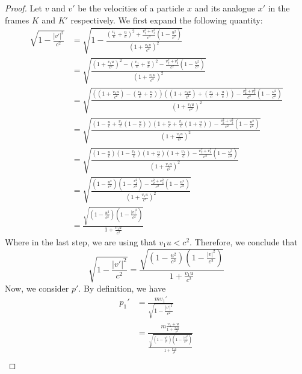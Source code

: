 \documentclass{article}
\begin{document}
\begin{proof}
    Let $v$ and $v'$ be the velocities of a particle $x$ and its analogue $x'$ in the frames $K$ and $K'$ respectively. We first expand the following quantity:
    \begin{align*}
        \sqrt{1-\frac{|v'|^2}{c^2}} &= \sqrt{1-\frac{\left(\frac{v_1}{c}+\frac{u}{c}\right)^2 + \frac{v_2^2 + v_3^2}{c^2}\left(1-\frac{u^2}{c^2}\right)}{\left(1+\frac{v_1u}{c^2}\right)^2}}\\
        &= \sqrt{\frac{\left(1+\frac{v_1u}{c^2}\right)^2-\left(\frac{v_1}{c}+\frac{u}{c}\right)^2 - \frac{v_2^2 + v_3^2}{c^2}\left(1-\frac{u^2}{c^2}\right)}{\left(1+\frac{v_1u}{c^2}\right)^2}}\\
        &= \sqrt{\frac{\left(\left(1+\frac{v_1u}{c^2}\right)-\left(\frac{v_1}{c}+\frac{u}{c}\right)\right)\left(\left(1+\frac{v_1u}{c^2}\right)+\left(\frac{v_1}{c}+\frac{u}{c}\right)\right) - \frac{v_2^2 + v_3^2}{c^2}\left(1-\frac{u^2}{c^2}\right)}{\left(1+\frac{v_1u}{c^2}\right)^2}}\\
        &= \sqrt{\frac{\left(1-\frac{u}{c}+\frac{v_1}{c}\left(1-\frac{u}{c}\right)\right)\left(1+\frac{u}{c}+\frac{v_1}{c}\left(1+\frac{u}{c}\right)\right) - \frac{v_2^2 + v_3^2}{c^2}\left(1-\frac{u^2}{c^2}\right)}{\left(1+\frac{v_1u}{c^2}\right)^2}}\\
        &= \sqrt{\frac{\left(1-\frac{u}{c}\right)\left(1-\frac{v_1}{c}\right)\left(1+\frac{u}{c}\right)\left(1+\frac{v_1}{c}\right) - \frac{v_2^2 + v_3^2}{c^2}\left(1-\frac{u^2}{c^2}\right)}{\left(1+\frac{v_1u}{c^2}\right)^2}}\\
        &=\sqrt{\frac{\left(1-\frac{u^2}{c^2}\right)\left(1-\frac{v_1^2}{c^2}\right) - \frac{v_2^2 + v_3^2}{c^2}\left(1-\frac{u^2}{c^2}\right)}{\left(1+\frac{v_1u}{c^2}\right)^2}}\\
        &=\frac{\sqrt{\left(1-\frac{u^2}{c^2}\right)\left(1-\frac{|v|^2}{c^2}\right)}}{1+\frac{v_1u}{c^2}}
    \end{align*}
    Where in the last step, we are using that $v_1u<c^2$. Therefore, we conclude that
    \[\sqrt{1-\frac{|v'|^2}{c^2}}=\frac{\sqrt{\left(1-\frac{u^2}{c^2}\right)\left(1-\frac{|v|^2}{c^2}\right)}}{1+\frac{v_1u}{c^2}}\]
    Now, we consider $p'$. By definition, we have
    \begin{align*}
        p_1'&= \frac{mv_1'}{\sqrt{1-\frac{|v'|^2}{c^2}}}\\
        &=\frac{m\frac{v_1+u}{1+\frac{v_1u}{c^2}}}{\frac{\sqrt{\left(1-\frac{u^2}{c^2}\right)\left(1-\frac{|v|^2}{c^2}\right)}}{1+\frac{v_1u}{c^2}}}\\

\end{align*}
\end{proof}
\end{document}
